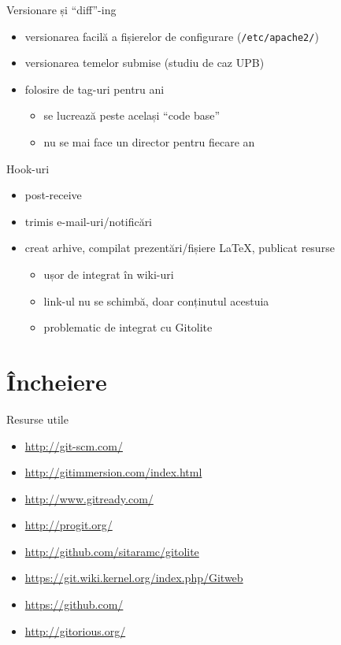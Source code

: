 \documentclass{simple}
\begin{document}
\begin{frame}{Versionare și ``diff''-ing}
	\begin{itemize}
		\item versionarea facilă a fișierelor de configurare
		(\texttt{/etc/apache2/})
		\item versionarea temelor submise (studiu de caz UPB)
		\item folosire de tag-uri pentru ani
			\begin{itemize}
				\item se lucrează peste același ``code base''
				\item nu se mai face un director pentru fiecare an
			\end{itemize}
	\end{itemize}
\end{frame}

\begin{frame}{Hook-uri}
	\begin{itemize}
		\item post-receive
		\item trimis e-mail-uri/notificări
		\item creat arhive, compilat prezentări/fișiere LaTeX, publicat
		resurse
			\begin{itemize}
				\item ușor de integrat în wiki-uri
				\item link-ul nu se schimbă, doar conținutul acestuia
                \item problematic de integrat cu Gitolite
			\end{itemize}
	\end{itemize}
\end{frame}

\section{Încheiere}

\begin{frame}{Resurse utile}
	\begin{itemize}
		\item \url{http://git-scm.com/}
        \item \url{http://gitimmersion.com/index.html}
        \item \url{http://www.gitready.com/}
		\item \url{http://progit.org/}
		\item \url{http://github.com/sitaramc/gitolite}
		\item \url{https://git.wiki.kernel.org/index.php/Gitweb}
        \item \url{https://github.com/}
        \item \url{http://gitorious.org/}
	\end{itemize}
\end{frame}
\end{document}
